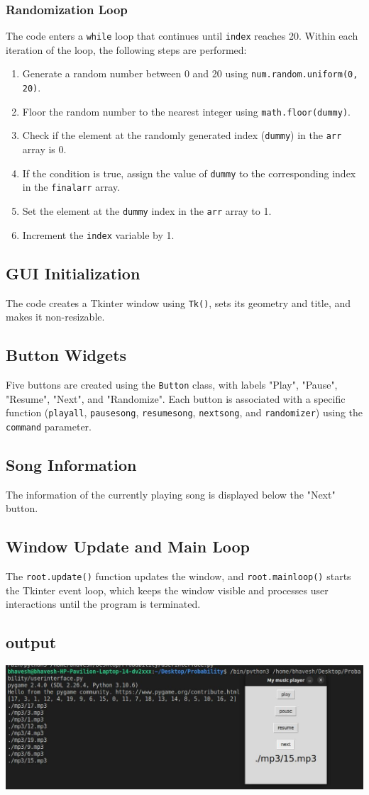 \documentclass[journal,12pt,twocolumn]{IEEEtran}
\begin{document}
\subsubsection{Randomization Loop}
The code enters a \texttt{while} loop that continues until \texttt{index} reaches 20. Within each iteration of the loop, the following steps are performed:
\begin{enumerate}
  \item Generate a random number between 0 and 20 using \texttt{num.random.uniform(0, 20)}.
  \item Floor the random number to the nearest integer using \texttt{math.floor(dummy)}.
  \item Check if the element at the randomly generated index (\texttt{dummy}) in the \texttt{arr} array is 0.
  \item If the condition is true, assign the value of \texttt{dummy} to the corresponding index in the \texttt{finalarr} array.
  \item Set the element at the \texttt{dummy} index in the \texttt{arr} array to 1.
  \item Increment the \texttt{index} variable by 1.
\end{enumerate}

\subsection{GUI Initialization}
The code creates a Tkinter window using \texttt{Tk()}, sets its geometry and title, and makes it non-resizable.

\subsection{Button Widgets}
Five buttons are created using the \texttt{Button} class, with labels "Play", "Pause", "Resume", "Next", and "Randomize". Each button is associated with a specific function (\texttt{playall}, \texttt{pausesong}, \texttt{resumesong}, \texttt{nextsong}, and \texttt{randomizer}) using the \texttt{command} parameter.

\subsection{Song Information}
The information of the currently playing song is displayed below the "Next" button.

\subsection{Window Update and Main Loop}
The \texttt{root.update()} function updates the window, and \texttt{root.mainloop()} starts the Tkinter event loop, which keeps the window visible and processes user interactions until the program is terminated.

\subsection{output}
\includegraphics[scale=0.25]{./output.jpg}
\end{document}
